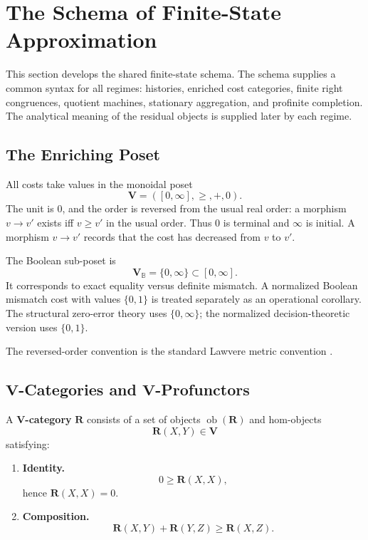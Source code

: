 \documentclass[12pt]{article}
\theoremstyle{definition}
\begin{document}
\section{The Schema of Finite-State Approximation}
\label{sec:schema}

This section develops the shared finite-state schema.  The schema supplies a
common syntax for all regimes: histories, enriched cost categories, finite
right congruences, quotient machines, stationary aggregation, and profinite
completion.  The analytical meaning of the residual objects is supplied later
by each regime.

\subsection{The Enriching Poset}
\label{subsec:enriching-poset}

All costs take values in the monoidal poset
\[
\mathbf V=([0,\infty],\ge,+,0).
\]
The unit is $0$, and the order is reversed from the usual real order: a
morphism $v\to v'$ exists iff $v\ge v'$ in the usual order.  Thus $0$ is
terminal and $\infty$ is initial.  A morphism $v\to v'$ records that the cost
has decreased from $v$ to $v'$.

The Boolean sub-poset is
\[
\mathbf V_{\mathbb B}=\{0,\infty\}\subset[0,\infty].
\]
It corresponds to exact equality versus definite mismatch.  A normalized
Boolean mismatch cost with values $\{0,1\}$ is treated separately as an
operational corollary.  The structural zero-error theory uses
$\{0,\infty\}$; the normalized decision-theoretic version uses $\{0,1\}$.

The reversed-order convention is the standard Lawvere metric convention
\cite{lawvere1973}.

\subsection{$\mathbf V$-Categories and $\mathbf V$-Profunctors}
\label{subsec:V-cats-profunctors}

A \textbf{$\mathbf V$-category} $\mathbf R$ consists of a set of objects
$\operatorname{ob}(\mathbf R)$ and hom-objects
\[
\mathbf R(X,Y)\in\mathbf V
\]
satisfying:
\begin{enumerate}[label=(\roman*),nosep]
\item \textbf{Identity.}
\[
0\ge \mathbf R(X,X),
\]
hence $\mathbf R(X,X)=0$.

\item \textbf{Composition.}
\[
\mathbf R(X,Y)+\mathbf R(Y,Z)\ge \mathbf R(X,Z).
\]
\end{enumerate}
\end{document}
